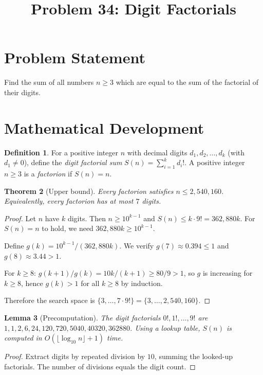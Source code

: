 \documentclass[12pt]{article}
\title{Problem 34: Digit Factorials}
\author{}
\date{}
\newtheorem{theorem}{Theorem}
\newtheorem{lemma}[theorem]{Lemma}
\theoremstyle{definition}
\newtheorem{definition}[theorem]{Definition}
\begin{document}
\maketitle

\section{Problem Statement}
Find the sum of all numbers $n \ge 3$ which are equal to the sum of the factorial of their digits.

\section{Mathematical Development}

\begin{definition}
For a positive integer $n$ with decimal digits $d_1, d_2, \ldots, d_k$ (with $d_1 \ne 0$), define the \emph{digit factorial sum} $S(n) = \sum_{i=1}^{k} d_i!$. A positive integer $n \ge 3$ is a \emph{factorion} if $S(n) = n$.
\end{definition}

\begin{theorem}[Upper bound]
\label{thm:bound}
Every factorion satisfies $n \le 2{,}540{,}160$. Equivalently, every factorion has at most $7$ digits.
\end{theorem}

\begin{proof}
Let $n$ have $k$ digits. Then $n \ge 10^{k-1}$ and $S(n) \le k \cdot 9! = 362{,}880k$. For $S(n) = n$ to hold, we need $362{,}880k \ge 10^{k-1}$.

Define $g(k) = 10^{k-1}/(362{,}880k)$. We verify $g(7) \approx 0.394 \le 1$ and $g(8) \approx 3.44 > 1$.

For $k \ge 8$: $g(k+1)/g(k) = 10k/(k+1) \ge 80/9 > 1$, so $g$ is increasing for $k \ge 8$, hence $g(k) > 1$ for all $k \ge 8$ by induction.

Therefore the search space is $\{3, \ldots, 7 \cdot 9!\} = \{3, \ldots, 2{,}540{,}160\}$.
\end{proof}

\begin{lemma}[Precomputation]
The digit factorials $0!, 1!, \ldots, 9!$ are $1, 1, 2, 6, 24, 120, 720, 5040, 40320, 362880$. Using a lookup table, $S(n)$ is computed in $O(\lfloor \log_{10} n \rfloor + 1)$ time.
\end{lemma}

\begin{proof}
Extract digits by repeated division by $10$, summing the looked-up factorials. The number of divisions equals the digit count.
\end{proof}
\end{document}
